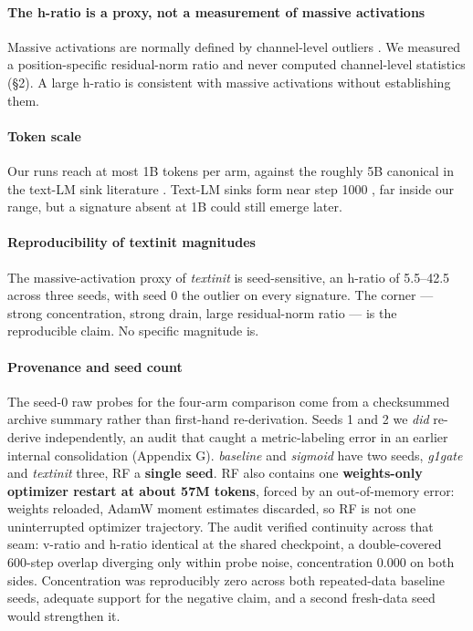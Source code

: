 \documentclass{article}
\begin{document}
\paragraph{The h-ratio is a proxy, not a measurement of massive activations} Massive activations are normally defined by channel-level outliers \cite{ref2,ref5}. We measured a position-specific residual-norm ratio and never computed channel-level statistics (\S2). A large h-ratio is consistent with massive activations without establishing them.

\paragraph{Token scale} Our runs reach at most 1B tokens per arm, against the roughly 5B canonical in the text-LM sink literature \cite{ref6}. Text-LM sinks form near step 1000 \cite{ref7}, far inside our range, but a signature absent at 1B could still emerge later.

\paragraph{Reproducibility of textinit magnitudes} The massive-activation proxy of \textit{textinit} is seed-sensitive, an h-ratio of 5.5--42.5 across three seeds, with seed 0 the outlier on every signature. The corner --- strong concentration, strong drain, large residual-norm ratio --- is the reproducible claim. No specific magnitude is.

\paragraph{Provenance and seed count} The seed-0 raw probes for the four-arm comparison come from a checksummed archive summary rather than first-hand re-derivation. Seeds 1 and 2 we \textit{did} re-derive independently, an audit that caught a metric-labeling error in an earlier internal consolidation (Appendix G). \textit{baseline} and \textit{sigmoid} have two seeds, \textit{g1gate} and \textit{textinit} three, RF a \textbf{single seed}. RF also contains one \textbf{weights-only optimizer restart at about 57M tokens}, forced by an out-of-memory error: weights reloaded, AdamW moment estimates discarded, so RF is not one uninterrupted optimizer trajectory. The audit verified continuity across that seam: v-ratio and h-ratio identical at the shared checkpoint, a double-covered 600-step overlap diverging only within probe noise, concentration 0.000 on both sides. Concentration was reproducibly zero across both repeated-data baseline seeds, adequate support for the negative claim, and a second fresh-data seed would strengthen it.
\end{document}
